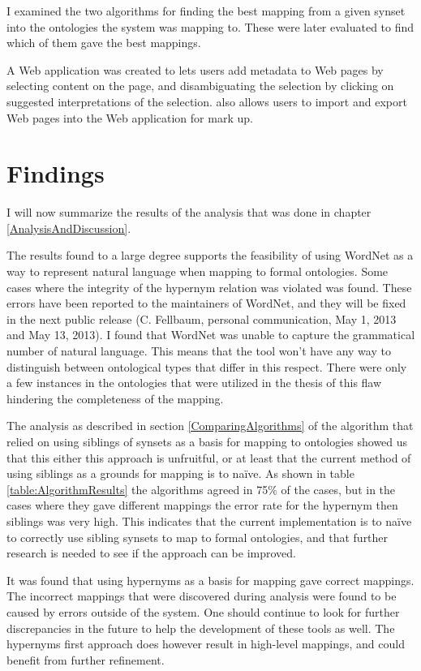 I examined the two algorithms for finding the best mapping from a given synset into the ontologies the system was mapping to.
These were later evaluated to find which of them gave the best mappings.

A Web application was created to lets users add metadata to Web pages by selecting content on the page,
and disambiguating the selection by clicking on suggested interpretations of the selection.
\Theartefact also allows users to import and export Web pages into the Web application for mark up.

\section{Findings}
I will now summarize the results of the analysis that was done in chapter \ref{AnalysisAndDiscussion}.

The results found to a large degree supports the feasibility of using WordNet as a way to represent natural language
when mapping to formal ontologies.
Some cases where the integrity of the hypernym relation was violated was found.
These errors have been reported to the maintainers of WordNet, and they will be fixed in the next public  release (C. Fellbaum, personal communication, May 1, 2013 and May 13, 2013).
I found that WordNet was unable to capture the grammatical number of natural language.
This means that the tool won't have any way to distinguish between ontological types that differ in this respect.
There were only a few instances in the ontologies that were utilized in the thesis of this flaw hindering the completeness of the mapping.

The analysis as described in section \ref{ComparingAlgorithms} of the algorithm that relied on
using siblings of synsets as a basis for mapping to ontologies showed us that this either this approach is unfruitful,
or at least that the current method of using siblings as a grounds for mapping is to naïve.
As shown in table \ref{table:AlgorithmResults} the algorithms agreed in 75\% of the cases,
but in the cases where they gave different mappings the error rate for the hypernym then siblings was very high.
This indicates that the current implementation is to naïve to correctly use sibling synsets to map to formal ontologies,
and that further research is needed to see if the approach can be improved.

It was found that using hypernyms as a basis for mapping gave correct mappings.
The incorrect mappings that were discovered during analysis were found to be caused by errors outside of the system.
One should continue to look for further discrepancies in the future to help the development of these tools as well.
The hypernyms first approach does however result in high-level mappings, and could benefit from further refinement.

